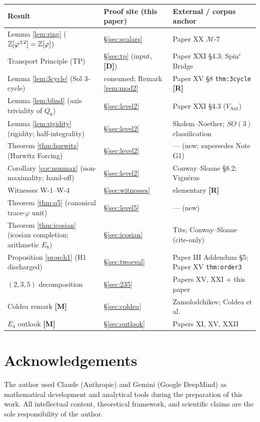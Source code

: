 \documentclass[11pt,a4paper]{article}
\theoremstyle{plain}
\theoremstyle{definition}
\theoremstyle{remark}
\newcounter{witness}
\newcommand{\Zphi}{\mathbb{Z}[\varphi]}
\newcommand{\rtag}[1]{\textnormal{\textbf{[#1]}}}
\begin{document}
\begin{center}
\small
\begin{tabular}{@{}lll@{}}
\toprule
\textbf{Result} & \textbf{Proof site (this paper)} & \textbf{External / corpus anchor} \\
\midrule
Lemma \ref{lem:ring} ($\Z[\varphi^{\pm2}] = \Zphi$) & \S\ref{sec:scalars} & Paper XX $\mathcal{M}$-7 \\
Transport Principle (TP) & \S\ref{sec:tp} (input, \rtag{D}) & Paper XXI \S4.3; Spin$^c$ Bridge \\
Lemma \ref{lem:3cycle} (Sol 3-cycle) & consumed; Remark \ref{rem:mod2} & Paper XV \S8 \texttt{thm:3cycle} \rtag{R} \\
Lemma \ref{lem:blind} (axis triviality of $Q_8$) & \S\ref{sec:level2} & Paper XXI \S4.3 ($V_{\mathrm{Aut}}$) \\
Lemma \ref{lem:rigidity} (rigidity; half-integrality) & \S\ref{sec:level2} & Skolem--Noether; $SO(3)$ classification \\
Theorem \ref{thm:hurwitz} (Hurwitz Forcing) & \S\ref{sec:level2} & --- (new; supersedes Note G1) \\
Corollary \ref{cor:nonmax} (non-maximality; hand-off) & \S\ref{sec:level2} & Conway--Sloane \S8.2; Vign\'eras \\
Witnesses W-1--W-4 & \S\ref{sec:witnesses} & elementary \rtag{R} \\
Theorem \ref{thm:q5} (canonical trace-$\varphi$ unit) & \S\ref{sec:level5} & --- (new) \\
Theorem \ref{thm:icosian} (icosian completion; arithmetic $E_8$) & \S\ref{sec:icosian} & Tits; Conway--Sloane (cite-only) \\
Proposition \ref{prop:h1} (H1 discharged) & \S\ref{sec:twoeval} & Paper III Addendum \S5; Paper XV \texttt{thm:order3} \\
$(2,3,5)$ decomposition & \S\ref{sec:235} & Papers XV, XXI $+$ this paper \\
Coldea remark \rtag{M} & \S\ref{sec:coldea} & Zamolodchikov; Coldea et al. \\
$E_4$ outlook \rtag{M} & \S\ref{sec:outlook} & Papers XI, XV, XXII \\
\bottomrule
\end{tabular}
\end{center}

\section*{Acknowledgements}
The author used Claude (Anthropic) and Gemini (Google DeepMind) as mathematical development and analytical tools during the preparation of this work. All intellectual content, theoretical framework, and scientific claims are the sole responsibility of the author.
\end{document}
